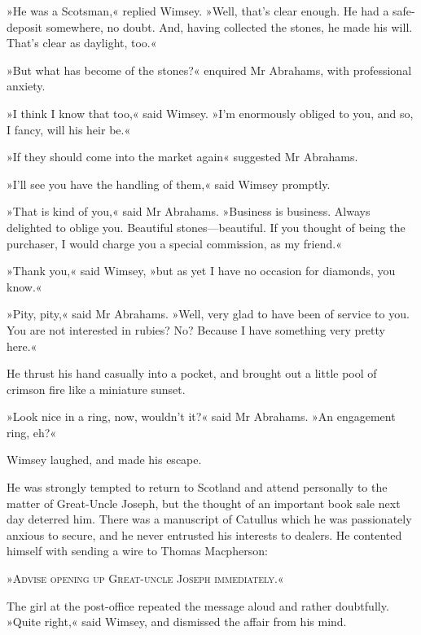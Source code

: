 »He was a Scotsman,« replied Wimsey. »Well, that's clear enough. He had a safe-deposit somewhere, no doubt. And, having collected the stones, he made his will. That's clear as daylight, too.«

»But what has become of the stones?« enquired Mr Abrahams, with professional anxiety.

»I think I know that too,« said Wimsey. »I'm enormously obliged to you, and so, I fancy, will his heir be.«

»If they should come into the market again\longdash« suggested Mr Abrahams.

»I'll see you have the handling of them,« said Wimsey promptly.

»That is kind of you,« said Mr Abrahams. »Business is business. Always delighted to oblige you. Beautiful stones—beautiful. If you thought of being the purchaser, I would charge you a special commission, as my friend.«

»Thank you,« said Wimsey, »but as yet I have no occasion for diamonds, you know.«

»Pity, pity,« said Mr Abrahams. »Well, very glad to have been of service to you. You are not interested in rubies? No? Because I have something very pretty here.«

He thrust his hand casually into a pocket, and brought out a little pool of crimson fire like a miniature sunset.

»Look nice in a ring, now, wouldn't it?« said Mr Abrahams. »An engagement ring, eh?«

Wimsey laughed, and made his escape.

He was strongly tempted to return to Scotland and attend personally to the matter of Great-Uncle Joseph, but the thought of an important book sale next day deterred him. There was a manuscript of Catullus which he was passionately anxious to secure, and he never entrusted his interests to dealers. He contented himself with sending a wire to Thomas Macpherson:

»\textsc{Advise opening up Great-uncle Joseph immediately.}«

The girl at the post-office repeated the message aloud and rather doubtfully. »Quite right,« said Wimsey, and dismissed the affair from his mind.

